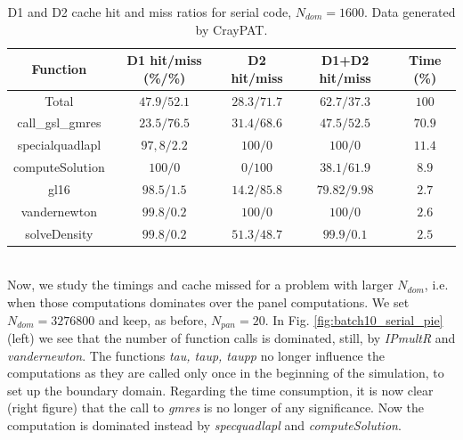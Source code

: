 \documentclass[a4paper,10pt]{article}
\begin{document}
\begin{table}[ht]
\begin{center}
    \begin{tabular}{ c | c | c | c | c }
        Function & D1 hit/miss (\%/\%) & D2 hit/miss & D1+D2 hit/miss & Time (\%) \\ \hline
        Total & $47.9/52.1$ & $28.3/71.7$ & $62.7/37.3$ & $100$ \\ 
        call\_gsl\_gmres & $23.5/76.5$ & $31.4/68.6$ & $47.5/52.5$ & $70.9$ \\
        specialquadlapl & $97,8/2.2$ & $100/0$ & $100/0$ & $11.4$ \\
        computeSolution & $100/0$ & $0/100$ & $38.1/61.9$ & $8.9$ \\
        gl16 & $98.5/1.5$ & $14.2/85.8$ & $79.82/9.98$ & $2.7$ \\
        vandernewton & $99.8/0.2$ & $100/0$ & $100/0$ & $2.6$ \\
        solveDensity & $99.8/0.2$ & $51.3/48.7$ & $99.9/0.1$ & $2.5$
    \end{tabular}
    \caption{D1 and D2 cache hit and miss ratios for serial code, $N_{dom} = 1600$. Data generated by CrayPAT.}
    \label{tab:batch4_serial_caches}
\end{center}
\end{table}  \\
Now, we study the timings and cache missed for a problem with larger $N_{dom}$, i.e. when those computations dominates over the panel computations. We set $N_{dom} = 3276800$ and keep, as before, $N_{pan}=20$. In Fig. \ref{fig:batch10_serial_pie} (left) we see that the number of function calls is dominated, still, by \textit{IPmultR} and \textit{vandernewton}. The functions \textit{tau, taup, taupp} no longer influence the computations as they are called only once in the beginning of the simulation, to set up the boundary domain. Regarding the time consumption, it is now clear (right figure) that the call to \textit{gmres} is no longer of any significance. Now the computation is dominated instead by \textit{specquadlapl} and \textit{computeSolution}.
\end{document}
